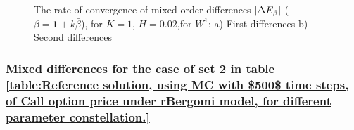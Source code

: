 \documentclass[11pt]{article}
\begin{document}
\begin{figure}[h!]
	
	\caption{The rate of convergence of  mixed order differences $\left\lvert\Delta E_{\beta}\right\rvert$ ($\beta=\mathbf{1}+k \bar{\beta}$), for $K=1$, $H=0.02$,for $W^1$: a) First differences  b) Second differences }
	\label{fig:mixed_diff_comp_K_1_H_002_wihtout_change_measure,linear}
\end{figure}

\FloatBarrier

\subsubsection{Mixed differences for the case of set 2 in table \ref{table:Reference solution, using MC with $500$ time steps, of Call option price under rBergomi model, for different parameter constellation.}}\label{Mixed differences for the case of set 2,linear}
\end{document}
